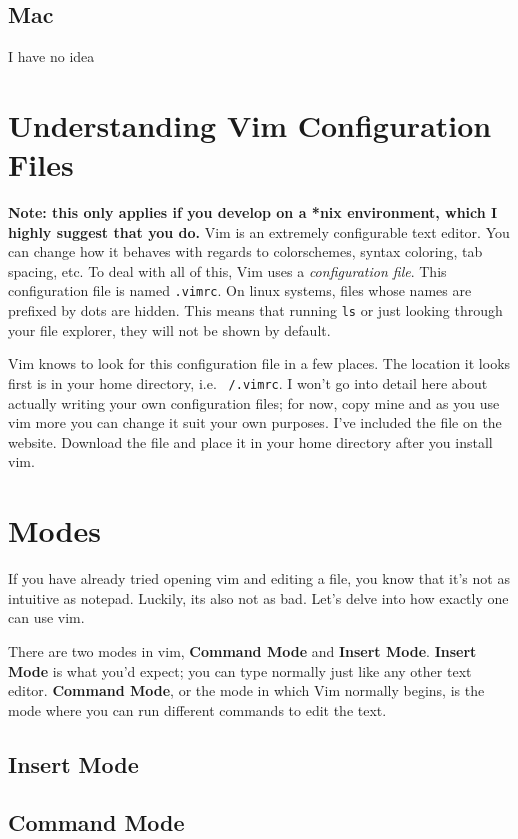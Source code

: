\subsection{Mac}
I have no idea %

\section{Understanding Vim Configuration Files}
{\bf Note: this only applies if you develop on a *nix environment,
which I highly suggest that you do.}
Vim is an extremely configurable text editor. You can change how it 
behaves with regards to colorschemes, syntax coloring, tab spacing,
etc. To deal with all of this, Vim uses a \emph{configuration file}.
This configuration file is named \texttt{.vimrc}. On linux systems, files
whose names are prefixed by dots are hidden. This means that running \texttt{ls}
or just looking through your file explorer, they will not be shown by default.

Vim knows to look for this configuration file in a few places. The location 
it looks first is in your home directory, i.e. \texttt{~/.vimrc}. I won't
go into detail here about actually writing your own configuration files;
for now, copy mine and as you use vim more you can change it suit
your own purposes. I've included the file on the website. %
Download the file and place it in your home directory after you install vim.

\section{Modes}
If you have already tried opening vim and editing a file, you know that it's
not as intuitive as notepad. Luckily, its also not as bad. Let's
delve into how exactly one can use vim. 

There are two modes in vim, {\bf Command Mode} and {\bf Insert Mode}.
{\bf Insert Mode} is what you'd expect; you can type normally just
like any other text editor. {\bf Command Mode}, or the mode in which
Vim normally begins, is the mode where you can run different commands
to edit the text. 

\subsection{Insert Mode}
\subsection{Command Mode}

